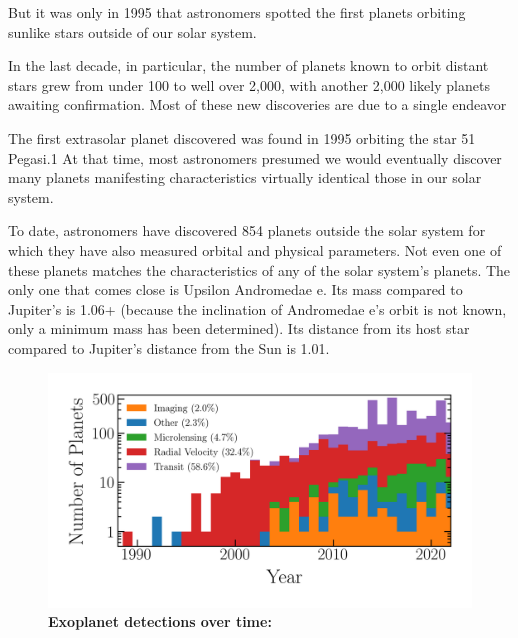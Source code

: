 But it was only in 1995 that astronomers spotted the first planets orbiting sunlike stars outside of our solar system.

In the last decade, in particular, the number of planets known to orbit distant stars grew from under 100 to well over 2,000, with another 2,000 likely planets awaiting confirmation. Most of these new discoveries are due to a single endeavor 


The first extrasolar planet discovered was found in 1995 orbiting the star 51 Pegasi.1 At that time, most astronomers presumed we would eventually discover many planets manifesting characteristics virtually identical those in our solar system.

To date, astronomers have discovered 854 planets outside the solar system for which they have also measured orbital and physical parameters. Not even one of these planets matches the characteristics of any of the solar system’s planets. The only one that comes close is Upsilon Andromedae e. Its mass compared to Jupiter’s is 1.06+ (because the inclination of Andromedae e’s orbit is not known, only a minimum mass has been determined). Its distance from its host star compared to Jupiter’s distance from the Sun is 1.01.





\begin{figure}
\begin{center}
  \centerline{\includegraphics[width=1.\linewidth]{src/figures/confirmed_planets_vs_time.png}}
  \caption{\textbf{Exoplanet detections over time:}  }
  \label{fig:exo_detections_over_time}
\end{center}
\end{figure}


